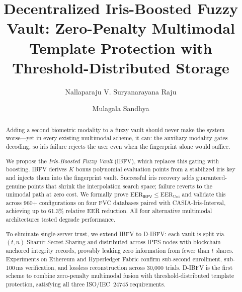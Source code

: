 \documentclass[3p,twocolumn]{elsarticle}
\newcommand{\IBFV}{\textsf{IBFV}}
\newcommand{\DIBFV}{\textsf{D-IBFV}}
\newcommand{\EER}{\mathrm{EER}}
\begin{document}
\begin{frontmatter}

\title{Decentralized Iris-Boosted Fuzzy Vault: Zero-Penalty Multimodal Template Protection with Threshold-Distributed Storage}

\author[nitw]{Nallaparaju V. Suryanarayana Raju}

\author[nitw]{Mulagala Sandhya}



\begin{abstract}
Adding a second biometric modality to a fuzzy vault should never make the system worse---yet in every existing multimodal scheme, it can: the auxiliary modality gates decoding, so iris failure rejects the user even when the fingerprint alone would suffice.

We propose the \emph{Iris-Boosted Fuzzy Vault} (\IBFV{}), which replaces this gating with boosting. \IBFV{} derives $K$ bonus polynomial evaluation points from a stabilized iris key and injects them into the fingerprint vault. Successful iris recovery adds guaranteed-genuine points that shrink the interpolation search space; failure reverts to the unimodal path at zero cost. We formally prove $\EER_{\IBFV} \leq \EER_{\text{Uni}}$ and validate this across 960+ configurations on four FVC databases paired with CASIA-Iris-Interval, achieving up to 61.3\% relative EER reduction. All four alternative multimodal architectures tested degrade performance.

To eliminate single-server trust, we extend \IBFV{} to \DIBFV{}: each vault is split via $(t,n)$-Shamir Secret Sharing and distributed across IPFS nodes with blockchain-anchored integrity records, provably leaking zero information from fewer than $t$ shares. Experiments on Ethereum and Hyperledger Fabric confirm sub-second enrollment, sub-100\,ms verification, and lossless reconstruction across 30{,}000 trials. \DIBFV{} is the first scheme to combine zero-penalty multimodal fusion with threshold-distributed template protection, satisfying all three ISO/IEC~24745 requirements.
\end{abstract}


\end{frontmatter}
\end{document}
